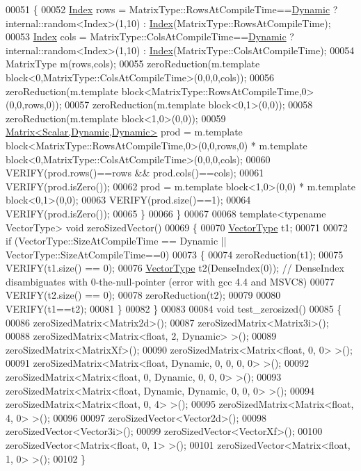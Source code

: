 \begin{DoxyCode}
00051   \{
00052     \hyperlink{namespace_eigen_a62e77e0933482dafde8fe197d9a2cfde}{Index} rows = MatrixType::RowsAtCompileTime==\hyperlink{namespace_eigen_ad81fa7195215a0ce30017dfac309f0b2}{Dynamic} ? internal::random<Index>(1,10) : 
      \hyperlink{namespace_eigen_a62e77e0933482dafde8fe197d9a2cfde}{Index}(MatrixType::RowsAtCompileTime);
00053     \hyperlink{namespace_eigen_a62e77e0933482dafde8fe197d9a2cfde}{Index} cols = MatrixType::ColsAtCompileTime==\hyperlink{namespace_eigen_ad81fa7195215a0ce30017dfac309f0b2}{Dynamic} ? internal::random<Index>(1,10) : 
      \hyperlink{namespace_eigen_a62e77e0933482dafde8fe197d9a2cfde}{Index}(MatrixType::ColsAtCompileTime);
00054     MatrixType m(rows,cols);
00055     zeroReduction(m.template block<0,MatrixType::ColsAtCompileTime>(0,0,0,cols));
00056     zeroReduction(m.template block<MatrixType::RowsAtCompileTime,0>(0,0,rows,0));
00057     zeroReduction(m.template block<0,1>(0,0));
00058     zeroReduction(m.template block<1,0>(0,0));
00059     \hyperlink{group___core___module}{Matrix<Scalar,Dynamic,Dynamic>} prod = m.template 
      block<MatrixType::RowsAtCompileTime,0>(0,0,rows,0) * m.template block<0,MatrixType::ColsAtCompileTime>(0,0,0,cols);
00060     VERIFY(prod.rows()==rows && prod.cols()==cols);
00061     VERIFY(prod.isZero());
00062     prod = m.template block<1,0>(0,0) * m.template block<0,1>(0,0);
00063     VERIFY(prod.size()==1);
00064     VERIFY(prod.isZero());
00065   \}
00066 \}
00067 
00068 \textcolor{keyword}{template}<\textcolor{keyword}{typename} VectorType> \textcolor{keywordtype}{void} zeroSizedVector()
00069 \{
00070   \hyperlink{struct_vector_type}{VectorType} t1;
00071 
00072   \textcolor{keywordflow}{if} (VectorType::SizeAtCompileTime == Dynamic || VectorType::SizeAtCompileTime==0)
00073   \{
00074     zeroReduction(t1);
00075     VERIFY(t1.size() == 0);
00076     \hyperlink{struct_vector_type}{VectorType} t2(DenseIndex(0)); \textcolor{comment}{// DenseIndex disambiguates with 0-the-null-pointer (error with
       gcc 4.4 and MSVC8)}
00077     VERIFY(t2.size() == 0);
00078     zeroReduction(t2);
00079 
00080     VERIFY(t1==t2);
00081   \}
00082 \}
00083 
00084 \textcolor{keywordtype}{void} test\_zerosized()
00085 \{
00086   zeroSizedMatrix<Matrix2d>();
00087   zeroSizedMatrix<Matrix3i>();
00088   zeroSizedMatrix<Matrix<float, 2, Dynamic> >();
00089   zeroSizedMatrix<MatrixXf>();
00090   zeroSizedMatrix<Matrix<float, 0, 0> >();
00091   zeroSizedMatrix<Matrix<float, Dynamic, 0, 0, 0, 0> >();
00092   zeroSizedMatrix<Matrix<float, 0, Dynamic, 0, 0, 0> >();
00093   zeroSizedMatrix<Matrix<float, Dynamic, Dynamic, 0, 0, 0> >();
00094   zeroSizedMatrix<Matrix<float, 0, 4> >();
00095   zeroSizedMatrix<Matrix<float, 4, 0> >();
00096 
00097   zeroSizedVector<Vector2d>();
00098   zeroSizedVector<Vector3i>();
00099   zeroSizedVector<VectorXf>();
00100   zeroSizedVector<Matrix<float, 0, 1> >();
00101   zeroSizedVector<Matrix<float, 1, 0> >();
00102 \}
\end{DoxyCode}
